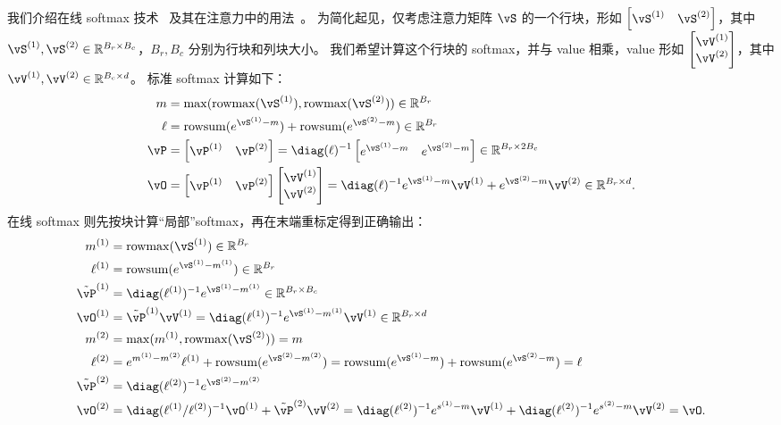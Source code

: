我们介绍在线 softmax 技术~\citep{milakov2018online} 及其在注意力中的用法~\citep{rabe2021self}。
为简化起见，仅考虑注意力矩阵 $\vS$ 的一个行块，形如
$\begin{bmatrix} \vS^{(1)} & \vS^{(2)} \end{bmatrix}$，其中
$\vS^{(1)},\vS^{(2)} \in \mathbb{R}^{B_r\times B_c}$，$B_r,B_c$ 分别为行块和列块大小。
我们希望计算这个行块的 softmax，并与 value 相乘，value 形如
$\begin{bmatrix} \vV^{(1)} \\ \vV^{(2)} \end{bmatrix}$，其中
$\vV^{(1)},\vV^{(2)} \in \mathbb{R}^{B_c\times d}$。
标准 softmax 计算如下：
\begin{align*}
  m &= \max(\mathrm{rowmax}(\vS^{(1)}), \mathrm{rowmax}(\vS^{(2)})) \in \mathbb{R}^{B_r}  \\
  \ell &= \mathrm{rowsum}(e^{\vS^{(1)} - m}) + \mathrm{rowsum}(e^{\vS^{(2)} - m}) \in \mathbb{R}^{B_r}  \\
  \vP &= \begin{bmatrix} \vP^{(1)} & \vP^{(2)} \end{bmatrix} = \diag(\ell)^{-1}\begin{bmatrix} e^{\vS^{(1)} - m} & e^{\vS^{(2)} - m} \end{bmatrix} \in \mathbb{R}^{B_r \times 2B_c} \\
  \vO &= \begin{bmatrix} \vP^{(1)} & \vP^{(2)} \end{bmatrix} \begin{bmatrix} \vV^{(1)} \\ \vV^{(2)} \end{bmatrix} = \diag(\ell)^{-1} e^{\vS^{(1)} - m} \vV^{(1)} + e^{\vS^{(2)} - m} \vV^{(2)} \in \mathbb{R}^{B_r \times d}.
\end{align*}
在线 softmax 则先按块计算“局部”softmax，再在末端重标定得到正确输出：
\begin{align*}
  m^{(1)} &= \mathrm{rowmax}(\vS^{(1)})  \in \mathbb{R}^{B_r}\\
  \ell^{(1)} &= \mathrm{rowsum}(e^{\vS^{(1)} - m^{(1)}}) \in \mathbb{R}^{B_r} \\
  \tilde{\vP}^{(1)} &= \diag(\ell^{(1)})^{-1} e^{\vS^{(1)} - m^{(1)}} \in \mathbb{R}^{B_r \times B_c}\\
  \vO^{(1)} &= \tilde{\vP}^{(1)} \vV^{(1)} = \diag(\ell^{(1)})^{-1} e^{\vS^{(1)} - m^{(1)}} \vV^{(1)} \in \mathbb{R}^{B_r \times d}\\
  m^{(2)} &= \max(m^{(1)}, \mathrm{rowmax}(\vS^{(2)})) = m \\
  \ell^{(2)} &= e^{m^{(1)} - m^{(2)}} \ell^{(1)} + \mathrm{rowsum}(e^{\vS^{(2)} - m^{(2)}}) = \mathrm{rowsum}(e^{\vS^{(1)} - m}) + \mathrm{rowsum}(e^{\vS^{(2)} - m}) = \ell \\
  \tilde{\vP}^{(2)} &= \diag(\ell^{(2)})^{-1} e^{\vS^{(2)} - m^{(2)}} \\
  \vO^{(2)} &= \diag(\ell^{(1)} / \ell^{(2)})^{-1} \vO^{(1)} + \tilde{\vP}^{(2)} \vV^{(2)} = \diag(\ell^{(2)})^{-1} e^{s^{(1)} - m} \vV^{(1)} + \diag(\ell^{(2)})^{-1} e^{s^{(2)} - m} \vV^{(2)} = \vO.
\end{align*}

